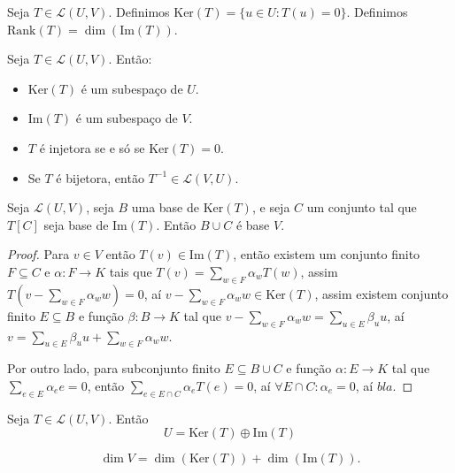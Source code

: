 \documentclass[11pt,twoside,a4paper]{book}
\begin{document}
\begin{definicao}
Seja $T\in\mathcal{L}(U,V)$. Definimos $\mathrm{Ker}(T)=\{u\in U:T(u)=0\}$. Definimos $\mathrm{Rank}(T)=\dim(\mathrm{Im}(T))$.
\end{definicao}

\begin{proposicao}
Seja $T\in\mathcal{L}(U,V)$. Então:
\begin{itemize}
\item $\mathrm{Ker}(T)$ é um subespaço de $U$.
\item $\mathrm{Im}(T)$ é um subespaço de $V$.
\item $T$ é injetora se e só se $\mathrm{Ker}(T)=0$.
\item Se $T$ é bijetora, então $T^{-1}\in\mathcal{L}(V,U)$.
\end{itemize}
\end{proposicao}

\begin{teorema}
Seja $\mathcal{L}(U,V)$, seja $B$ uma base de $\mathrm{Ker}(T)$, e seja $C$ um conjunto tal que $T[C]$ seja base de $\mathrm{Im}(T)$. Então $B\cup C$ é base $V$.
\end{teorema}
\begin{proof}
Para $v\in V$ então $T(v)\in\mathrm{Im}(T)$, então existem um conjunto finito $F\subseteq C$ e $\alpha:F\rightarrow K$ tais que $T(v)=\sum\limits_{w\in F}\alpha_wT(w)$, assim $T\left(v-\sum\limits_{w\in F}\alpha_ww\right)=0$, aí $v-\sum\limits_{w\in F}\alpha_ww\in\mathrm{Ker}(T)$, assim existem conjunto finito $E\subseteq B$ e função $\beta:B\rightarrow K$ tal que $v-\sum\limits_{w\in F}\alpha_ww=\sum\limits_{u\in E}\beta_uu$, aí $v=\sum\limits_{u\in E}\beta_uu+\sum\limits_{w\in F}\alpha_ww$.

\medskip
\noindent
Por outro lado, para subconjunto finito $E\subseteq B\cup C$ e função $\alpha:E\rightarrow K$ tal que $\sum_{e\in E}\alpha_ee=0$, então $\sum_{e\in E\cap C}\alpha_eT(e)=0$, aí $\forall E\cap C:\alpha_e=0$, aí $bla$. 
\end{proof}

\begin{teorema} 
Seja $T \in \mathcal{L}(U,V).$ Então
\[
U = \mathrm{Ker}(T) \oplus \mathrm{Im}(T)
\]

\end{teorema}
\begin{corolario}
\[
\dim V=\dim(\mathrm{Ker}(T))+\dim(\mathrm{Im}(T)).
\]
\end{corolario}
\end{document}
